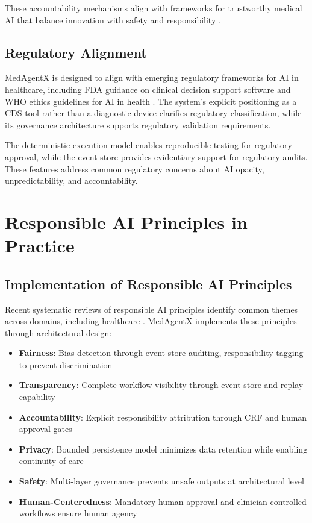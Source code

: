 \documentclass[conference]{IEEEtran}
\begin{document}
These accountability mechanisms align with frameworks for trustworthy medical AI that balance innovation with safety and responsibility \cite{ethics_governance_medical_ai_2023}.

\subsection{Regulatory Alignment}
MedAgentX is designed to align with emerging regulatory frameworks for AI in healthcare, including FDA guidance on clinical decision support software \cite{fda2021} and WHO ethics guidelines for AI in health \cite{who2021}. The system's explicit positioning as a CDS tool rather than a diagnostic device clarifies regulatory classification, while its governance architecture supports regulatory validation requirements.

The deterministic execution model enables reproducible testing for regulatory approval, while the event store provides evidentiary support for regulatory audits. These features address common regulatory concerns about AI opacity, unpredictability, and accountability.

\section{Responsible AI Principles in Practice}

\subsection{Implementation of Responsible AI Principles}
Recent systematic reviews of responsible AI principles identify common themes across domains, including healthcare \cite{responsible_ai_principles_2024}. MedAgentX implements these principles through architectural design:

\begin{itemize}
    \item \textbf{Fairness}: Bias detection through event store auditing, responsibility tagging to prevent discrimination
    \item \textbf{Transparency}: Complete workflow visibility through event store and replay capability
    \item \textbf{Accountability}: Explicit responsibility attribution through CRF and human approval gates
    \item \textbf{Privacy}: Bounded persistence model minimizes data retention while enabling continuity of care
    \item \textbf{Safety}: Multi-layer governance prevents unsafe outputs at architectural level
    \item \textbf{Human-Centeredness}: Mandatory human approval and clinician-controlled workflows ensure human agency
\end{itemize}
\end{document}
